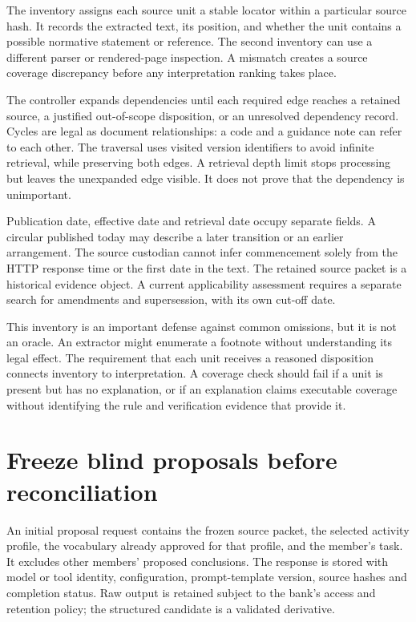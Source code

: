 \documentclass[12pt,a4paper,oneside,openany]{book}
\begin{document}
The inventory assigns each source unit a stable locator within a particular
source hash. It records the extracted text, its position, and whether the unit
contains a possible normative statement or reference. The second inventory can
use a different parser or rendered-page inspection. A mismatch creates a source
coverage discrepancy before any interpretation ranking takes place.

The controller expands dependencies until each required edge reaches a retained
source, a justified out-of-scope disposition, or an unresolved dependency record.
Cycles are legal as document relationships: a code and a guidance note can refer
to each other. The traversal uses visited version identifiers to avoid infinite
retrieval, while preserving both edges. A retrieval depth limit stops processing
but leaves the unexpanded edge visible. It does not prove that the dependency is
unimportant.

Publication date, effective date and retrieval date occupy separate fields. A
circular published today may describe a later transition or an earlier
arrangement. The source custodian cannot infer commencement solely from the HTTP
response time or the first date in the text. The retained source packet is a
historical evidence object. A current applicability assessment requires a
separate search for amendments and supersession, with its own cut-off date.

This inventory is an important defense against common omissions, but it is not
an oracle. An extractor might enumerate a footnote without understanding its
legal effect. The requirement that each unit receives a reasoned disposition
connects inventory to interpretation. A coverage check should fail if a unit is
present but has no explanation, or if an explanation claims executable coverage
without identifying the rule and verification evidence that provide it.

\section{Freeze blind proposals before reconciliation}

An initial proposal request contains the frozen source packet, the selected
activity profile, the vocabulary already approved for that profile, and the
member's task. It excludes other members' proposed conclusions. The response is
stored with model or tool identity, configuration, prompt-template version, source
hashes and completion status. Raw output is retained subject to the bank's access
and retention policy; the structured candidate is a validated derivative.
\end{document}

